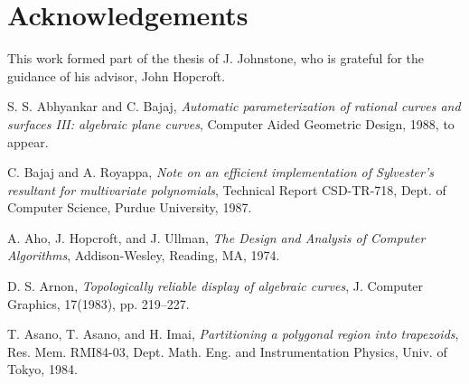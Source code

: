 \section{Acknowledgements}
This work formed part of the thesis of J. Johnstone, who is grateful for
the guidance of his advisor, John Hopcroft.
%


\begin{thebibliography}{Abhyankar 87b}




 S. S. Abhyankar and C. Bajaj,
{\em Automatic parameterization of rational curves and surfaces III:
algebraic plane curves},
Computer Aided Geometric Design,  1988, to appear.


C. Bajaj and A. Royappa,
{\em Note on an efficient implementation of Sylvester's resultant for multivariate 
polynomials},
Technical Report CSD-TR-718, Dept. of Computer Science, Purdue University, 1987. 

A. Aho, J. Hopcroft, and J. Ullman, 
{\em The Design and Analysis of Computer Algorithms},
Addison-Wesley, Reading, MA, 1974.

D. S. Arnon, {\em Topologically reliable display of algebraic curves},
J. Computer Graphics, 17(1983), pp. 219--227.

T. Asano, T. Asano, and H. Imai,
{\em Partitioning a polygonal region into trapezoids},
Res. Mem. RMI84-03, Dept. Math. Eng. and Instrumentation Physics, Univ. of 
Tokyo, 1984.


\end{thebibliography}
